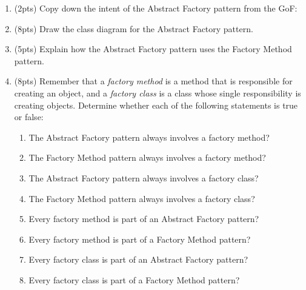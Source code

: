 \documentclass[11pt]{article}
\begin{document}
\begin{enumerate}
\begin{enumerate}
    \item (2pts) Copy down the intent of the Abstract Factory pattern from the GoF:

    \vspace{0.6in}

    \item (8pts) Draw the class diagram for the Abstract Factory pattern.

    \vfill
    \vfill

    \item (5pts) Explain how the Abstract Factory pattern uses the Factory Method pattern.

    \vfill

    \item (8pts) Remember that a \emph{factory method} is a method that is responsible for creating an object, and a \emph{factory class} is a class whose single responsibility is creating objects. Determine whether each of the following statements is true or false:

    \begin{enumerate}

      \item The Abstract Factory pattern always involves a factory method?
      \item The Factory Method pattern always involves a factory method?
      \item The Abstract Factory pattern always involves a factory class?
      \item The Factory Method pattern always involves a factory class?
      \item Every factory method is part of an Abstract Factory pattern?
      \item Every factory method is part of a Factory Method pattern?
      \item Every factory class is part of an Abstract Factory pattern?
      \item Every factory class is part of a Factory Method pattern?

    \end{enumerate}

  \end{enumerate}

\newpage


\end{enumerate}
\end{document}
